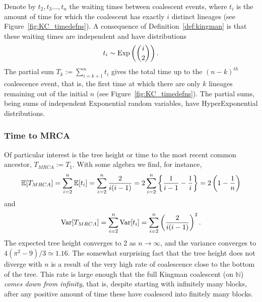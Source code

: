 Denote by $t_2, t_3 \dots, t_n$ the waiting times between coalescent events, where $t_i$ is the amount of time for which the coalescent has exactly $i$ distinct lineages (see Figure~\ref{fig:KC_timedefns}).
A consequence of Definition~\ref{def:kingman} is that these waiting times are independent and have distributions
\begin{equation*}
t_i \sim \operatorname{Exp}\left( \binom{i}{2} \right) .
\end{equation*}
The partial sum $T_k := \sum_{i=k+1}^n t_i$ gives the total time up to the $(n-k)^{th}$ coalescence event, that is, the first time at which there are only $k$ lineages remaining out of the initial $n$ (see Figure~\ref{fig:KC_timedefns}).
The partial sums, being sums of independent Exponential random variables, have HyperExponential distributions.


\subsubsection{Time to MRCA}
Of particular interest is the tree height or time to the most recent common ancestor, $T_{MRCA} := T_1$.
With some algebra we find, for instance,
\begin{equation*}
\mathbb{E}[ T_{MRCA} ] 
= \sum_{i=2}^{n} \mathbb{E}[t_i]
= \sum_{i=2}^n \frac{2}{i(i-1)}
= 2 \sum_{i=2}^n \left\{ \frac{1}{i-1} - \frac{1}{i} \right\}
= 2 \left( 1 - \frac{1}{n} \right)
\end{equation*}
and
\begin{equation*}
\operatorname{Var}[ T_{MRCA} ] 
= \sum_{i=2}^n \operatorname{Var}[t_i]
= \sum_{i=2}^n \left( \frac{2}{i(i-1)} \right)^2 .
\end{equation*}
The expected tree height converges to 2 as $n\to\infty$, and the variance converges to $4(\pi^2 - 9)/3 \simeq 1.16$.
The somewhat surprising fact that the tree height does not diverge with $n$ is a result of the very high rate of coalescence close to the bottom of the tree. This rate is large enough that the full Kingman coalescent (on $\mathbb{N}$) \emph{comes down from infinity}, that is, despite starting with infinitely many blocks, after any positive amount of time these have coalesced into finitely many blocks.


